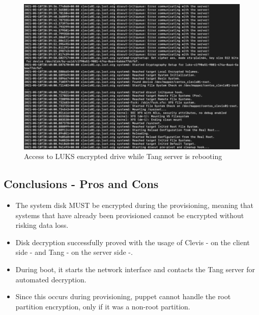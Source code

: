 \begin{figure}
  \includegraphics[width=16cm]{images/image1.png}
  \centering
  \caption{Access to LUKS encrypted drive while Tang server is rebooting}
\end{figure}

\newpage
\subsection{Conclusions - Pros and Cons}
\begin{itemize}
  \item The system disk MUST be encrypted during the provisioning, meaning that systems that have already been provisioned cannot be encrypted without risking data loss.
  \item Disk decryption successfully proved with the usage of Clevis - on the client side - and Tang - on the server side -. 
  \item During boot, it starts the network interface and contacts the Tang server for automated decryption.
  \item Since this occurs during provisioning, puppet cannot handle the root partition encryption, only if it was a non-root partition.
\end{itemize}


\newpage